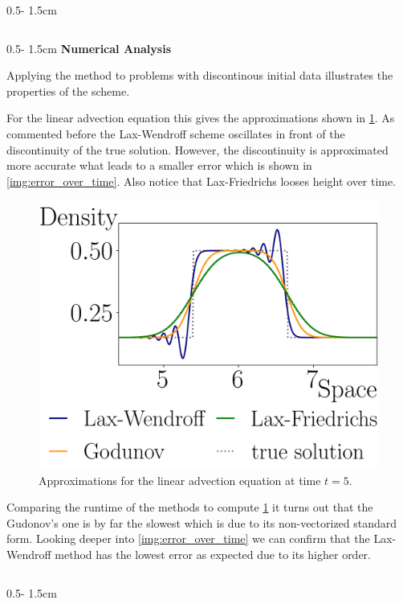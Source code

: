 \documentclass{uibposter}
\begin{document}
\begin{frame}[fragile]
\begin{columns}
\begin{column}{0.5\textwidth - 1.5cm}
\begin{column}{0.5\textwidth - 1.5cm}
\vspace{0.5cm}
\textbf{Numerical Analysis}
\vspace{0.5cm}
    
Applying the method to problems with discontinous initial data illustrates the properties of the scheme.

\vspace{0.5cm}
For the linear advection equation this gives the approximations shown in \cref{img:linar_comprehension}. 
As commented before the Lax-Wendroff scheme oscillates in front of the discontinuity of the true solution. However, the discontinuity is approximated more accurate what leads to a smaller error which is shown in \cref{img:error_over_time}. Also notice that Lax-Friedrichs looses height over time. 

\begin{figure}[h]
	\includegraphics{fig/linear_compare.png}
	\caption{Approximations for the linear advection equation at time $t = 5$.}
	\label{img:linar_comprehension}
\end{figure}

Comparing the runtime of the methods to compute \cref{img:linar_comprehension} it turns out that the Gudonov's one is by far the slowest which is due to its non-vectorized standard form.
Looking deeper into \cref{img:error_over_time} we can confirm that the Lax-Wendroff method has the lowest error as expected due to its higher order.

\end{column}
\begin{column}{0.5\textwidth - 1.5cm}
	\vspace*{-1.7cm} 


\end{column}
\end{column}
\end{columns}
\end{frame}
\end{document}
